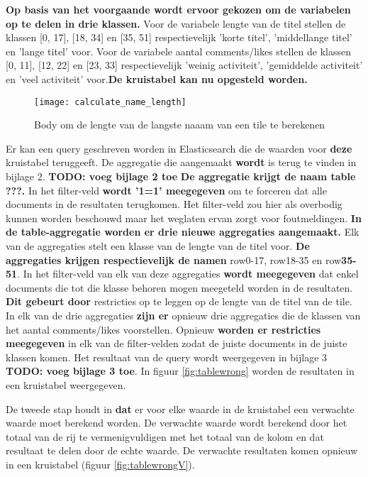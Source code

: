 \textbf{Op basis van het voorgaande wordt ervoor gekozen om de variabelen op te delen in drie klassen.} Voor de variabele lengte van de titel stellen de klassen [0, 17], [18, 34] en [35, 51] respectievelijk 'korte titel', 'middellange titel' en 'lange titel' voor. Voor de variabele aantal comments/likes stellen de klassen [0, 11], [12, 22] en [23, 33] respectievelijk 'weinig activiteit', 'gemiddelde activiteit' en 'veel activiteit' voor.\textbf{De kruistabel kan nu opgesteld worden.}

\begin{figure}
	\centering
	\texttt{[image: calculate\_name\_length]}
	\caption{Body om de lengte van de langste naaam van een tile te berekenen}
	\label{fig:calculatenamelength}
\end{figure}

Er kan een query geschreven worden in Elasticsearch die de waarden voor \textbf{deze} kruistabel teruggeeft. De aggregatie die aangemaakt \textbf{wordt} is terug te vinden in bijlage 2. \textbf{TODO: voeg bijlage 2 toe} \textbf{De aggregatie krijgt de naam table ???.} In het filter-veld \textbf{wordt '1=1' meegegeven}  om te forceren dat alle documents in de resultaten terugkomen. Het filter-veld zou hier als overbodig kunnen worden beschouwd maar het weglaten ervan zorgt voor foutmeldingen. \textbf{In de table-aggregatie worden er drie nieuwe aggregaties aangemaakt.} Elk van de aggregaties stelt een klasse van de lengte van de titel voor. \textbf{De aggregaties krijgen respectievelijk de namen} row0-17, row18-35 en row\textbf{35-51}. In het filter-veld van elk van deze aggregaties \textbf{wordt meegegeven} dat enkel documents die tot die klasse behoren mogen meegeteld worden in de resultaten. \textbf{Dit gebeurt door} restricties op te leggen op de lengte van de titel van de tile. In elk van de drie aggregaties \textbf{zijn er} opnieuw drie aggregaties die de klassen van het aantal comments/likes voorstellen. Opnieuw \textbf{worden er restricties meegegeven} in elk van de filter-velden zodat de juiste documents in de juiste klassen komen. Het resultaat van de query wordt weergegeven in bijlage 3 \textbf{TODO: voeg bijlage 3 toe}. In figuur \ref{fig:tablewrong} worden de resultaten in een kruistabel weergegeven.

De tweede stap houdt in \textbf{dat} er voor elke waarde in de kruistabel een verwachte waarde moet berekend worden. De verwachte waarde wordt berekend door het totaal van de rij te vermenigvuldigen met het totaal van de kolom en dat resultaat te delen door de echte waarde. De verwachte resultaten komen opnieuw in een kruistabel (figuur \ref{fig:tablewrongV}).

